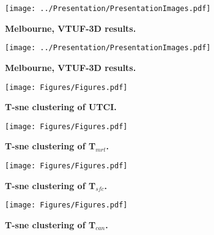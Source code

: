 \documentclass[utf8]{frontiersSCNS} %
\begin{document}
\begin{figure*}
\centering
\texttt{[image: ../Presentation/PresentationImages.pdf]}
\caption{\bf Melbourne, VTUF-3D results.}
 \label{fig:vtufresults}
\end{figure*} 



\begin{figure*}
\centering
\texttt{[image: ../Presentation/PresentationImages.pdf]}
\caption{\bf Melbourne, VTUF-3D results.}
\end{figure*} 


\begin{figure*}
\centering
\texttt{[image: Figures/Figures.pdf]}
\caption{\bf T-sne clustering of UTCI.}
 \label{fig:clusterutci}
\end{figure*} 

\begin{figure*}
\centering
\texttt{[image: Figures/Figures.pdf]}
\caption{\bf T-sne clustering of T$_{mrt}$.}
 \label{fig:clustertmrt}
\end{figure*} 

\begin{figure*}
\centering
\texttt{[image: Figures/Figures.pdf]}
\caption{\bf T-sne clustering of T$_{sfc}$.}
 \label{fig:clustertsfc}
\end{figure*} 

\begin{figure*}
\centering
\texttt{[image: Figures/Figures.pdf]}
\caption{\bf T-sne clustering of T$_{can}$.}
 \label{fig:clustertsfc}
\end{figure*} 
\end{document}
